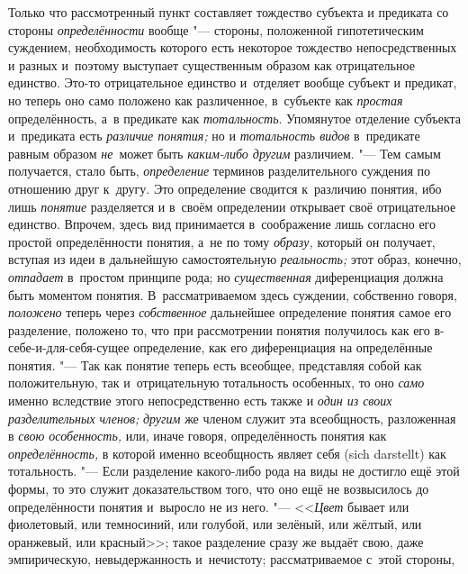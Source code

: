Только что рассмотренный пункт составляет тождество субъекта и
предиката со стороны {\em определённости}
вообще "--- стороны, положенной гипотетическим
суждением, необходимость которого есть некоторое тождество непосредственных
и разных и~поэтому выступает существенным образом как отрицательное
единство. Это-то отрицательное единство и~отделяет вообще субъект и
предикат, но теперь оно само положено как различенное, в~субъекте как
{\em простая} определённость, а~в предикате как {\em тотальность}.
Упомянутое отделение субъекта и~предиката есть {\em различие понятия;}
но и {\em тотальность видов} в~предикате равным образом {\em не}~может быть
{\em каким-либо другим} различием. "--- Тем самым получается, стало быть,
{\em определение} терминов разделительного суждения по отношению друг к~другу.
Это определение сводится к~различию понятия, ибо лишь {\em понятие} разделяется
и в~своём определении открывает своё отрицательное единство. Впрочем, здесь
вид принимается в~соображение лишь согласно его простой определённости
понятия, а~не по тому {\em образу,} который он получает, вступая из идеи
в дальнейшую самостоятельную {\em реальность;} этот образ, конечно,
{\em отпадает} в~простом принципе рода; но {\em существенная}
диференциация должна быть моментом понятия. В~рассматриваемом здесь
суждении, собственно говоря, {\em положено} теперь через {\em собственное}
дальнейшее определение понятия самое его разделение, положено
то, что при рассмотрении понятия получилось как его в-себе-и-для-себя-сущее
определение, как его диференциация на определённые понятия. "---
Так как понятие теперь есть всеобщее, представляя собой как
положительную, так и~отрицательную тотальность особенных, то оно
{\em само} именно вследствие этого непосредственно есть также и
{\em один из своих разделительных членов;} {\em другим} же
членом служит эта всеобщность, разложенная в {\em свою особенность,}
или, иначе говоря, определённость понятия как {\em определённость,} в
которой именно всеобщность являет себя (sich darstellt) как
тотальность. "--- Если разделение какого-либо рода на виды не
достигло ещё этой формы, то это служит доказательством того, что оно ещё не
возвысилось до определённости понятия и~выросло не из него. "---
<<{\em Цвет} бывает или фиолетовый, или темносиний, или голубой, или
зелёный, или жёлтый, или оранжевый, или красный>>;
такое разделение сразу же выдаёт свою, даже
эмпирическую, невыдержанность и~нечистоту; рассматриваемое с~этой стороны,
